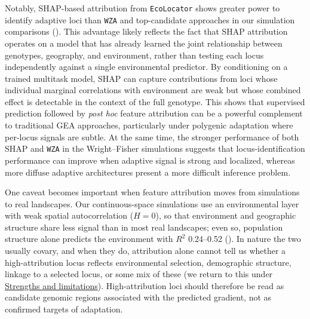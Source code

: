 \documentclass[]{article}
\newcommand{\ecolocator}{\texttt{EcoLocator}\xspace}
\begin{document}
Notably,
SHAP-based attribution from \ecolocator
shows greater power to identify adaptive loci
than \texttt{WZA} \citep{booker_wza_2024}
and top-candidate approaches
in our simulation comparisons
().
This advantage likely reflects the fact
that SHAP attribution operates on a model
that has already learned the joint relationship
between genotypes,
geography,
and environment,
rather than testing each locus independently
against a single environmental predictor.
By conditioning on a trained multitask model,
SHAP can capture contributions from loci
whose individual marginal correlations with environment are weak
but whose combined effect is detectable
in the context of the full genotype.
This shows that supervised prediction
followed by \textit{post hoc} feature attribution
can be a powerful complement to traditional GEA approaches,
particularly under polygenic adaptation
where per-locus signals are subtle.
At the same time, 
the stronger performance of both SHAP and \texttt{WZA}
in the Wright--Fisher simulations suggests that 
locus-identification performance can improve 
when adaptive signal is strong and localized,
whereas more diffuse adaptive architectures 
present a more difficult inference problem.

One caveat becomes important when feature attribution moves
from simulations to real landscapes.
 Our continuous-space simulations use an environmental layer with weak spatial autocorrelation ($H=0$), so that environment and geographic structure share less signal than in most real landscapes; even so, population structure alone predicts the environment with $R^2$ 0.24--0.52 ().
In nature the two usually covary, and when they do,
attribution alone cannot tell us whether a high-attribution locus
reflects environmental selection, demographic structure,
linkage to a selected locus, or some mix of these
(we return to this under \hyperref[sec:strengths-limitations]{Strengths and limitations}).
High-attribution loci should therefore be read as candidate
genomic regions associated with the predicted gradient,
not as confirmed targets of adaptation.
\end{document}
